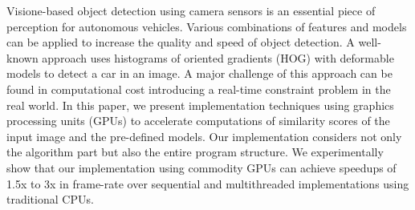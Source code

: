 Visione-based object detection using camera sensors is an essential piece
of perception for autonomous vehicles.
Various combinations of features and models can be applied to increase
the quality and speed of object detection.
A well-known approach uses histograms of oriented gradients (HOG)
with deformable models to detect a car in an image.
A major challenge of this approach can be found in computational cost
introducing a real-time constraint problem in the real world.
In this paper, we present implementation techniques using graphics
processing units (GPUs) to accelerate computations of similarity scores
of the input image and the pre-defined models.
Our implementation considers not only the algorithm part but also the
entire program structure.
We experimentally show that our implementation using commodity GPUs can
achieve speedups of 1.5x to 3x in frame-rate over sequential and
multithreaded implementations using traditional CPUs.